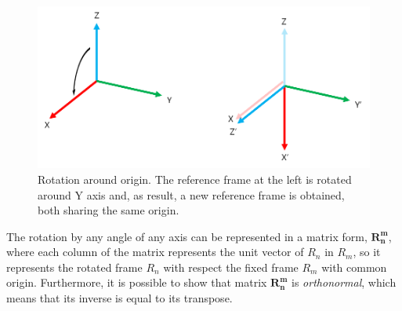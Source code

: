 \begin{figure}
    \centering
    \includegraphics[width=\textwidth]{Images/fig17-3D-rotation-example}
    \caption[Rotation around origin]{Rotation around origin. The reference frame at the left is rotated around Y axis and, as result, a new reference frame is obtained, both sharing the same origin.}
    \label{fig:chapter1:transformation:rotation:3d-example}
\end{figure}

The rotation by any angle of any axis can be represented in a matrix form, $\bm{R_n^m}$, where each column of the matrix represents the unit vector of $R_n$ in $R_m$, so it represents the rotated frame $R_n$ with respect the fixed frame $R_m$ with common origin. Furthermore, it is possible to show that matrix $\bm{R_n^m}$ is \emph{orthonormal}, which means that its inverse is equal to its transpose.\\

